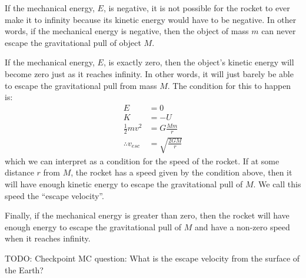 If the mechanical energy, $E$, is negative, it is not possible for the rocket to ever make it to infinity because its kinetic energy would have to be negative. In other words, if the mechanical energy is negative, then the object of mass $m$ can never escape the gravitational pull of object $M$. 

If the mechanical energy, $E$, is exactly zero, then the object's kinetic energy will become zero just as it reaches infinity. In other words, it will just barely be able to escape the gravitational pull from mass $M$. The condition for this to happen is:
\begin{align*}
E &= 0\\
K & = -U\\
\frac{1}{2}mv^2 &= G\frac{Mm}{r}\\
\therefore v_{esc} &= \sqrt{\frac{2GM}{r}}
\end{align*}
which we can interpret as a condition for the speed of the rocket. If at some distance $r$ from $M$, the rocket has a speed given by the condition above, then it will have enough kinetic energy to escape the gravitational pull of $M$. We call this speed the ``escape velocity''. 

Finally, if the mechanical energy is greater than zero, then the rocket will have enough energy to escape the gravitational pull of $M$ and have a non-zero speed when it reaches infinity. 

TODO: Checkpoint MC question: What is the escape velocity from the surface of the Earth?

